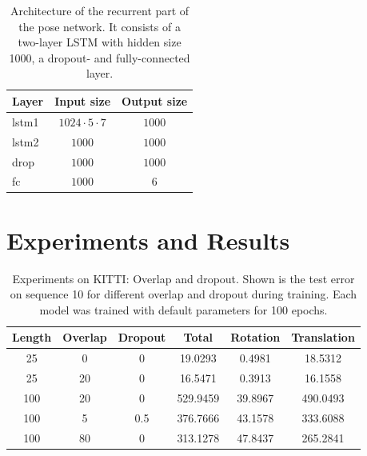 		\begin{table}[tb]
			\small
			\begin{center}
				\begin{tabular}{|l|c|c|}
					\hline
					Layer 		& Input size 					& Output size			\\ \hline
					lstm1 		& $1024 \cdot 5 \cdot 7$		& $1000$  				\\ \hline
					lstm2 		& $1000$						& $1000$ 				\\ \hline
					drop		& $1000$						& $1000$				\\ \hline
					fc 			& $1000$						& $6$					\\ \hline
				\end{tabular}
			\end{center}
			\caption[Architecture of the recurrent part of the pose network]
					{Architecture of the recurrent part of the pose network.
					 It consists of a two-layer LSTM with hidden size 1000, a dropout- and fully-connected layer.}
			\label{tbl:lstm_and_fc_after_flownet}
		\end{table}
	\section{Experiments and Results}
	
		\begin{table}[tb]
			\small
			\begin{center}
				\begin{tabular}{|c|c|c||c|c|c|}
					\hline
					Length 	& Overlap 	& Dropout	& Total 	& Rotation	& Translation	\\ \hline
					25		& 0			& 0			& 19.0293	& 0.4981	& 18.5312		\\ \hline
					25		& 20		& 0			& 16.5471	& 0.3913	& 16.1558		\\ \hline
					100		& 20		& 0			& 529.9459	& 39.8967	& 490.0493		\\ \hline
					100 	& 5			& 0.5		& 376.7666	& 43.1578	& 333.6088		\\ \hline
					100		& 80		& 0			& 313.1278	& 47.8437	& 265.2841		\\ \hline
				\end{tabular}
			\end{center}
			\caption[Experiments on KITTI: Overlap and dropout]
					{Experiments on KITTI: Overlap and dropout. 
					 Shown is the test error on sequence 10 for different overlap and dropout during training.
					 Each model was trained with default parameters for 100 epochs.
					 \label{tbl:kitti-overlap-and-dropout}}
		\end{table}
		
